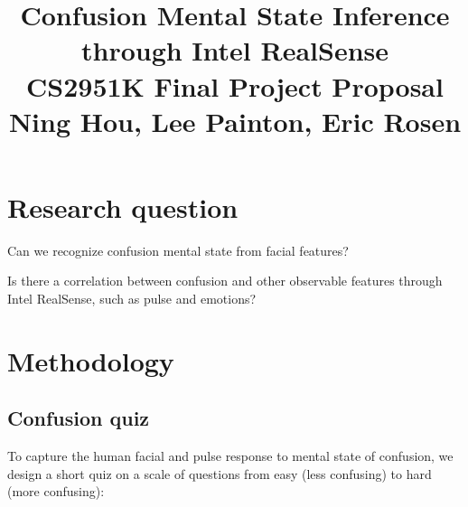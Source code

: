\documentclass[12pt,letterpaper]{article}
\begin{document}
\title{Confusion Mental State Inference \\through Intel RealSense\\ \vspace{2 mm} {\large CS2951K Final Project Proposal}\\ {\small Ning Hou, Lee Painton, Eric Rosen}}

\maketitle

\section{Research question}
Can we recognize confusion mental state from facial features? 

Is there a correlation between confusion and other observable features through Intel RealSense, such as pulse and emotions?



\section{Methodology}
\subsection{Confusion quiz}

To capture the human facial and pulse response to mental state of confusion, we design a short quiz on a scale of questions from easy (less confusing) to hard (more confusing):
\end{document}
